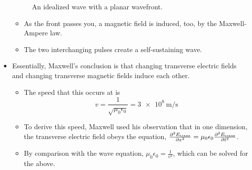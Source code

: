 \documentclass[../notes.tex]{subfiles}
\begin{document}
\begin{itemize}
\begin{figure}[h!]
        \caption{An idealized wave with a planar wavefront.}
        \label{fig:planarWavefront}
    \end{figure}
    \begin{itemize}
        \item As the front passes you, a magnetic field is induced, too, by the Maxwell-Ampere law.
        \item The two interchanging pulses create a self-sustaining wave.
    \end{itemize}
    \item Essentially, Maxwell's conclusion is that changing transverse electric fields and changing transverse magnetic fields induce each other.
    \begin{itemize}
        \item The speed that this occurs at is
        \begin{equation*}
            v = \frac{1}{\sqrt{\mu_0\epsilon_0}} = \SI{3e8}{\meter\per\second}
        \end{equation*}
        \item To derive this speed, Maxwell used his observation that in one dimension, the transverse electric field obeys the equation, $\pdv[2]{E_\text{trans}}{x}=\mu_0\epsilon_0\pdv[2]{E_\text{trans}}{t}$.
        \item By comparison with the wave equation, $\mu_0\epsilon_0=\frac{1}{v^2}$, which can be solved for the above.
    \end{itemize}
\end{itemize}
\end{document}

